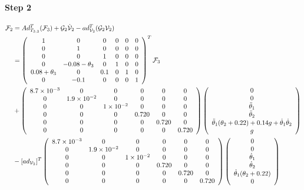 \documentclass[]{scrreprt}
\newcommand{\myvec}[1]{\left(\begin{array}{c}#1\end{array}\right)}
\begin{document}
\paragraph{Step 2}

\begin{align*}
\mathcal{F}_2 &= Ad_{T_{3,2}}^T(\mathcal{F}_{3})+\mathcal{G}_2\dot{\mathcal{V}}_2-ad_{\mathcal{V}_2}^T(\mathcal{G}_2\mathcal{V}_2)\\
&=\left(\begin{array}{cccccc}
1 & 0 & 0 & 0 & 0 & 0 \\
0 & 1 & 0 & 0 & 0 & 0 \\
0 & 0 & 1 & 0 & 0 & 0 \\
0 & -0.08-\theta_3 & 0 & 1 & 0 & 0 \\
0.08+\theta_3 & 0 & 0.1 & 0 & 1 & 0 \\
0 & -0.1 & 0 & 0 & 0 & 1
\end{array}\right)^T\mathcal{F}_{3}\\
&+\left(
\begin{array}{ccccccc}
\num{+8.7e-3} & \num{0} & \num{0} & 0 & 0 & 0\\
\num{0} & \num{+1.9e-2} & \num{0} & 0 & 0 & 0\\
\num{0} & \num{0} & \num{+1e-2} & 0 & 0 & 0\\
0 & 0 & 0 & 0.720 & 0 & 0\\
0 & 0 & 0 & 0 & 0.720 & 0\\
0 & 0 & 0 & 0 & 0 & 0.720
\end{array}
\right)\myvec{0\\0\\\tddot{1}\\\tddot{2}\\\tddot{1}(\theta_2+0.22)+0.14g+\tdot{1}\tdot{2}\\g}\\
&-[ad_{\mathcal{V}_2}]^T\left(
\begin{array}{ccccccc}
\num{+8.7e-3} & \num{0} & \num{0} & 0 & 0 & 0\\
\num{0} & \num{+1.9e-2} & \num{0} & 0 & 0 & 0\\
\num{0} & \num{0} & \num{+1e-2} & 0 & 0 & 0\\
0 & 0 & 0 & 0.720 & 0 & 0\\
0 & 0 & 0 & 0 & 0.720 & 0\\
0 & 0 & 0 & 0 & 0 & 0.720
\end{array}\right)\myvec{0 \\ 0 \\ \dot{\theta}_1\\ \dot{\theta}_2\\ \dot{\theta}_1(\theta_2+0.22)\\ 0}\\

\end{align*}
\end{document}
